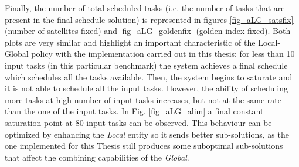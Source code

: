 Finally, the number of total scheduled tasks (i.e. the number of tasks that are present in the final schedule solution) is represented in figures \ref{fig_aLG_satsfix} (number of satellites fixed) and \ref{fig_aLG_goldenfix} (golden index fixed). Both plots are very similar and highlight an important characteristic of the Local-Global policy with the implementation carried out in this thesis: for less than 10 input tasks (in this particular benchmark) the system achieves a final schedule which schedules all the tasks available. Then, the system begins to saturate and it is not able to schedule all the input tasks. However, the ability of scheduling more tasks at high number of input tasks increases, but not at the same rate than the one of the input tasks. In Fig. \ref{fig_aLG_alim} a final constant saturation point at 80 input tasks can be observed. This behaviour can be optimized by enhancing the \emph{Local} entity so it sends better sub-solutions, as the one implemented for this Thesis still produces some suboptimal sub-solutions that affect the combining capabilities of the \emph{Global}.


